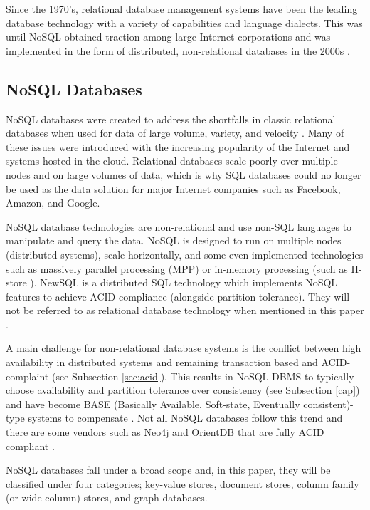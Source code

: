 Since the 1970's, relational database management systems have been the leading database technology with a variety of capabilities and language dialects. This was until NoSQL obtained traction among large Internet corporations and was implemented in the form of distributed, non-relational databases in the 2000s \cite{dataInNosql}.

\subsection{NoSQL Databases}
\label{nosqlDatabase}

NoSQL databases were created to address the shortfalls in classic relational databases when used for data of large volume, variety, and velocity \cite{nosqlDb}. Many of these issues were introduced with the increasing popularity of the Internet and systems hosted in the cloud. Relational databases scale poorly over multiple nodes and on large volumes of data, which is why SQL databases could no longer be used as the data solution for major Internet companies such as Facebook, Amazon, and Google.

NoSQL database technologies are non-relational and use non-SQL languages to manipulate and query the data. NoSQL is designed to run on multiple nodes (distributed systems), scale horizontally, and some even implemented technologies such as massively parallel processing (MPP) \cite{tigergraphMpp} or in-memory processing (such as H-store \cite{hstore}). NewSQL is a distributed SQL technology which implements NoSQL features to achieve ACID-compliance (alongside partition tolerance). They will not be referred to as relational database technology when mentioned in this paper \cite{nosqlDb}.

A main challenge for non-relational database systems is the conflict between high availability in distributed systems and remaining transaction based and ACID-complaint (see Subsection \ref{sec:acid}). This results in NoSQL DBMS to typically choose availability and partition tolerance over consistency (see Subsection \ref{cap}) and have become BASE (Basically Available, Soft-state, Eventually consistent)-type systems to compensate \cite{base}. Not all NoSQL databases follow this trend and there are some vendors such as Neo4j and OrientDB that are fully ACID compliant \cite{acid}.

NoSQL databases fall under a broad scope and, in this paper, they will be classified under four categories; key-value stores, document stores, column family (or wide-column) stores, and graph databases.

